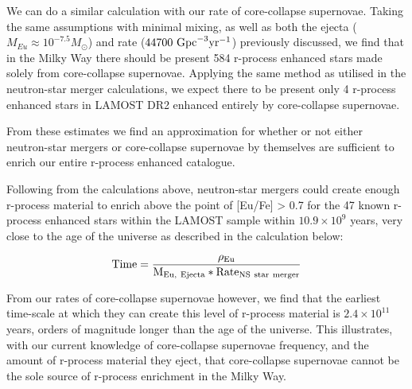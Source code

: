 \documentclass[a4paper,fleqn,usenatbib]{mnras}
\begin{document}
    
    We can do a similar calculation with our rate of core-collapse supernovae. Taking the same assumptions with minimal mixing, as well as both the ejecta ($M_{Eu}\approx10^{-7.5} M_{\odot}$) and rate ($44700\ \rm{Gpc}^{-3} \rm{yr^{-1}}$) previously discussed, we find that in the Milky Way there should be present 584 r-process enhanced stars made solely from core-collapse supernovae. Applying the same method as utilised in the neutron-star merger calculations, we expect there to be present only 4 r-process enhanced stars in LAMOST DR2 enhanced entirely by core-collapse supernovae.
    
    
    From these estimates we find an approximation for whether or not either neutron-star mergers or core-collapse supernovae by themselves are sufficient to enrich our entire r-process enhanced catalogue. 
    
    Following from the calculations above, neutron-star mergers could create enough r-process material to enrich above the point of [Eu/Fe] > 0.7 for the 47 known r-process enhanced stars within the LAMOST sample within $10.9\times10^{9}$ years, very close to the age of the universe as described in the calculation below:
    
    \begin{equation}
    	\rm Time = \frac{\rho_{\rm Eu}}{M_{\rm Eu,\ Ejecta}*Rate_{\rm NS\ star\ merger}}
    \end{equation}
    
	From our rates of core-collapse supernovae however, we find that the earliest time-scale at which they can create this level of r-process material is $2.4\times10^{11}$ years, orders of magnitude longer than the age of the universe. This illustrates, with our current knowledge of core-collapse supernovae frequency, and the amount of r-process material they eject, that core-collapse supernovae cannot be the sole source of r-process enrichment in the Milky Way.
    
\end{document}

